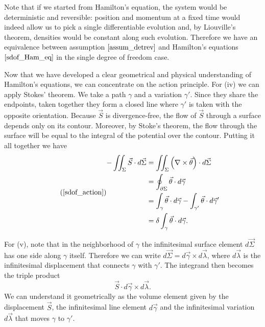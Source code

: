 \documentclass[10pt,twocolumn, nofootinbib]{revtex4-2}
\begin{document}
Note that if we started from Hamilton's equation, the system would be deterministic and reversible: position and momentum at a fixed time would indeed allow us to pick a single differentiable evolution and, by Liouville's theorem, densities would be constant along such evolution. Therefore we have an equivalence between assumption $\ref{assum_detrev}$ and Hamilton's equations $\ref{sdof_Ham_eq}$ in the single degree of freedom case.

Now that we have developed a clear geometrical and physical understanding of Hamilton's equations, we can concentrate on the action principle. For (iv) we can apply Stokes' theorem. We take a path $\gamma$ and a variation $\gamma'$. Since they share the endpoints, taken together they form a closed line where $\gamma'$ is taken with the opposite orientation. Because $\vec{S}$ is divergence-free, the flow of $\vec{S}$ through a surface depends only on its contour. Moreover, by Stoke's theorem, the flow through the surface will be equal to the integral of the potential over the contour. Putting it all together we have
\begin{equation}
\tag*{(\ref{sdof_action})}
\begin{aligned}
	- \iint_{\Sigma} \vec{S} \cdot d\vec{\Sigma} &=
	\iint_{\Sigma} \left( \nabla \times \vec{\theta} \right) \cdot d\vec{\Sigma} \\
	&= \oint_{\partial \Sigma} \vec{\theta}  \cdot d\vec{\gamma} \\
	&= \int_{\gamma} \vec{\theta} \cdot d\vec{\gamma} - \int_{\gamma'} \vec{\theta} \cdot d\vec{\gamma}' \\
	&= \delta \int_{\gamma} \vec{\theta} \cdot d\vec{\gamma}.
\end{aligned}
\end{equation}

For (v), note that in the neighborhood of $\gamma$ the infinitesimal surface element $d\vec{\Sigma}$ has one side along $\gamma$ itself. Therefore we can write $d\vec{\Sigma} = d\vec{\gamma} \times d\vec{\lambda}$, where $d\vec{\lambda}$ is the infinitesimal displacement that connects $\gamma$ with $\gamma'$. The integrand then becomes the triple product
\begin{equation}
	\vec{S} \cdot d\vec{\gamma} \times d\vec{\lambda}.
\end{equation}
We can understand it geometrically as the volume element given by the displacement $\vec{S}$, the infinitesimal line element $d\vec{\gamma}$ and the infinitesimal variation $d\vec{\lambda}$ that moves $\gamma$ to $\gamma'$.
\end{document}
